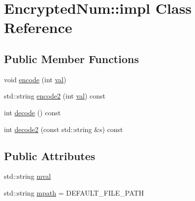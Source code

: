 \hypertarget{class_encrypted_num_1_1impl}{}\section{Encrypted\+Num\+:\+:impl Class Reference}
\label{class_encrypted_num_1_1impl}
\subsection*{Public Member Functions}
\begin{DoxyCompactItemize}
\item 
void \mbox{\hyperlink{class_encrypted_num_1_1impl_ab83894c5282275c278b7c93c67ae014c}{encode}} (int \mbox{\hyperlink{class_encrypted_num_a3cb78d22a4bbb6bd3199bcf10de04366}{val}})
\item 
std\+::string \mbox{\hyperlink{class_encrypted_num_1_1impl_a2ed6b50a7a30e43907180281aadf37f7}{encode2}} (int \mbox{\hyperlink{class_encrypted_num_a3cb78d22a4bbb6bd3199bcf10de04366}{val}}) const
\item 
int \mbox{\hyperlink{class_encrypted_num_1_1impl_acfb8cdcba7ef98973ae0ad981849bb43}{decode}} () const
\item 
int \mbox{\hyperlink{class_encrypted_num_1_1impl_ada1239b7988c4f313262bf2b8ed6a8e9}{decode2}} (const std\+::string \&s) const
\end{DoxyCompactItemize}
\subsection*{Public Attributes}
\begin{DoxyCompactItemize}
\item 
std\+::string \mbox{\hyperlink{class_encrypted_num_1_1impl_a5132feb4824b37424399309ee5db5b64}{mval}}
\item 
std\+::string \mbox{\hyperlink{class_encrypted_num_1_1impl_afa439f47a5dac2f30a40ce20f12a0f5a}{mpath}} = D\+E\+F\+A\+U\+L\+T\+\_\+\+F\+I\+L\+E\+\_\+\+P\+A\+TH
\end{DoxyCompactItemize}
